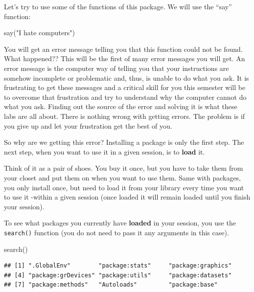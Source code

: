 \documentclass[
]{book}
\newenvironment{Shaded}{\begin{snugshade}}{\end{snugshade}}
\newcommand{\FunctionTok}[1]{\textcolor[rgb]{0.00,0.00,0.00}{#1}}
\newcommand{\NormalTok}[1]{#1}
\newcommand{\StringTok}[1]{\textcolor[rgb]{0.31,0.60,0.02}{#1}}
\begin{document}
Let's try to use some of the functions of this package. We will use the ``say'' function:

\begin{Shaded}
\begin{Highlighting}[]
\FunctionTok{say}\NormalTok{(}\StringTok{"I hate computers"}\NormalTok{)}
\end{Highlighting}
\end{Shaded}

You will get an error message telling you that this function could not be found. What happened?? This will be the first of many error messages you will get. An error message is the computer way of telling you that your instructions are somehow incomplete or problematic and, thus, is unable to do what you ask. It is frustrating to get these messages and a critical skill for you this semester will be to overcome that frustration and try to understand why the computer cannot do what you ask. Finding out the source of the error and solving it is what these labs are all about. There is nothing wrong with getting errors. The problem is if you give up and let your frustration get the best of you.

So why are we getting this error? Installing a package is only the first step. The next step, when you want to use it in a given session, is to \textbf{load} it.

Think of it as a pair of shoes. You buy it once, but you have to take them from your closet and put them on when you want to use them. Same with packages, you only install once, but need to load it from your library every time you want to use it -within a given session (once loaded it will remain loaded until you finish your session).

To see what packages you currently have \textbf{loaded} in your session, you use the \texttt{search()} function (you do not need to pass it any arguments in this case).

\begin{Shaded}
\begin{Highlighting}[]
\FunctionTok{search}\NormalTok{()}
\end{Highlighting}
\end{Shaded}

\begin{verbatim}
## [1] ".GlobalEnv"        "package:stats"     "package:graphics" 
## [4] "package:grDevices" "package:utils"     "package:datasets" 
## [7] "package:methods"   "Autoloads"         "package:base"
\end{verbatim}
\end{document}
